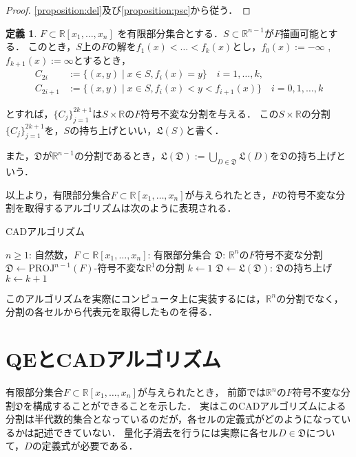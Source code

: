 \documentclass[uplatex, dvipdfmx]{jsarticle}
\newcommand{\R}{\mathbb{R}}
\newcommand{\PROJ}{\mathrm{PROJ}}
\theoremstyle{definition}
\newtheorem{definition}{定義}[section]
\begin{document}
\begin{proof}
\cref{proposition:del}及び\cref{proposition:psc}から従う．
\end{proof}

\begin{definition}
$ F \subset \mathbb{R}[x_1,\dots,x_n] $ を有限部分集合とする．$ S \subset \mathbb{R}^{n-1} $が$ F $描画可能とする．
このとき，$ S $上の$ F $の解を$ f_1(x)< \dots <f_k(x) $とし，$ f_0(x) := -\infty $ , $ f_{k+1}(x) := \infty $とするとき，
\begin{align*}
  C_{2i} &:= \{(x,y) \mid  x \in S, f_i(x) = y \} \quad i = 1,\dots, k,\\
  C_{2i+1} &:= \{(x,y) \mid x \in S, f_{i}(x)<y<f_{i+1}(x) \} \quad i = 0,1, \dots, k 
\end{align*}

とすれば，$\{C_j\}_{j=1}^{2k+1}$は$ S \times \mathbb{R} $の$F$符号不変な分割を与える．
この$ S \times \mathbb{R} $の分割$ \{C_j\}_{j=1}^{2k+1} $を，$ S $の持ち上げといい，$ \mathfrak{L}(S) $と書く．

また，$\mathfrak{D}$が$\R^{n-1}$の分割であるとき，$\mathfrak{L}(\mathfrak{D}) := \bigcup_{D \in \mathfrak{D}}\mathfrak{L}(D)$を$\mathfrak{D}$の持ち上げという．
\end{definition}

以上より，有限部分集合$F \subset \R[x_1, \dots, x_n]$が与えられたとき，$F$の符号不変な分割を取得するアルゴリズムは次のように表現される．

\begin{algorithm}
    \caption{CADアルゴリズム}
    \begin{algorithmic}[1]
    \REQUIRE $n \geq 1$: 自然数，$F \subset \R[x_1, \dots, x_n]$: 有限部分集合
    \ENSURE $\mathfrak{D}$: $\R^n$の$F$符号不変な分割
    \STATE $\mathfrak{D} \leftarrow \text{$\PROJ^{n-1}(F)$-符号不変な$\R^1$の分割}$
    \STATE $k \leftarrow 1$
    \STATE $\mathfrak{D} \leftarrow \text{$\mathfrak{L}(\mathfrak{D})$: $\mathfrak{D}$の持ち上げ}$
    \STATE $k \leftarrow k+1$
    \ENDWHILE
    \end{algorithmic}
\end{algorithm}

このアルゴリズムを実際にコンピュータ上に実装するには，$\R^n$の分割でなく，分割の各セルから代表元を取得したものを得る．

\section{QEとCADアルゴリズム}
有限部分集合$F \subset \R[x_1, \dots, x_n]$が与えられたとき，
前節では$\R^n$の$F$符号不変な分割$\mathfrak{D}$を構成することができることを示した．
実はこのCADアルゴリズムによる分割は半代数的集合となっているのだが，各セルの定義式がどのようになっているかは記述できていない．
量化子消去を行うには実際に各セル$D \in \mathfrak{D}$について，$D$の定義式が必要である．
\end{document}

